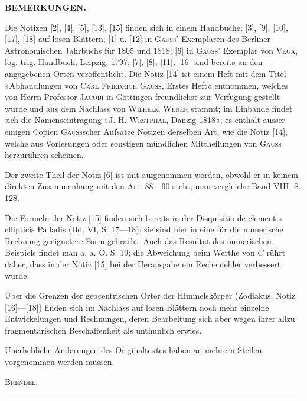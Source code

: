 \clearpage
{}
\begin{center}
\textbf{BEMERKUNGEN.}
\end{center}

Die Notizen [2], [4], [5], [13], [15] finden sich in einem Handbuche; [3], [9], [10], [17], [18] auf losen Blättern; [1] u. [12] in \textsc{Gauss}’ Exemplaren des Berliner Astronomischen Jahrbuchs für 1805 und 1818; [6] in \textsc{Gauss}’ Exemplar von \textsc{Vega}, log.-trig. Handbuch, Leipzig, 1797; [7], [8], [11], [16] sind bereits an den angegebenen Orten veröffentlicht. Die Notiz [14] ist einem Heft mit dem Titel »Abhandlungen von \textsc{Carl Friedrich Gauss}, Erstes Heft« entnommen, welches von Herrn Professor \textsc{Jacobi} in Göttingen freundlichst zur Verfügung gestellt wurde und aus dem Nachlass von \textsc{Wilhelm Weber} stammt; im Einbande findet sich die Namenseintragung »\textsc{J. H. Westphal}, Danzig 1818«; es enthält ausser einigen Copien \textsc{Gauss}scher Aufsätze Notizen derselben Art, wie die Notiz [14], welche aus Vorlesungen oder sonstigen mündlichen Mittheilungen von \textsc{Gauss} herzurühren scheinen.

Der zweite Theil der Notiz [6] ist mit aufgenommen worden, obwohl er in keinem direkten Zusammenhang mit den Art. 88---90 steht; man vergleiche Band VIII, S. 128.

Die Formeln der Notiz [15] finden sich bereits in der Disquisitio de elementis ellipticis Palladis (Bd. VI, S. 17---18); sie sind hier in eine für die numerische Rechnung geeignetere Form gebracht. Auch das Resultat des numerischen Beispiels findet man a. a. O. S. 19; die Abweichung beim Werthe von \(C\) rührt daher, dass in der Notiz [15] bei der Herausgabe ein Rechenfehler verbessert wurde.

Über die Grenzen der geocentrischen Örter der Himmelskörper (Zodiakus, Notiz [16]---[18]) finden sich im Nachlass auf losen Blättern noch mehr einzelne Entwickelungen und Rechnungen, deren Bearbeitung sich aber wegen ihrer allzu fragmentarischen Beschaffenheit als unthunlich erwies.

Unerhebliche Änderungen des Originaltextes haben an mehrern Stellen vorgenommen werden müssen.
\begin{flushright}
\textsc{Brendel}.
\end{flushright}
\begin{center}
\rule{0.3\linewidth}{0.4pt}
\end{center}
